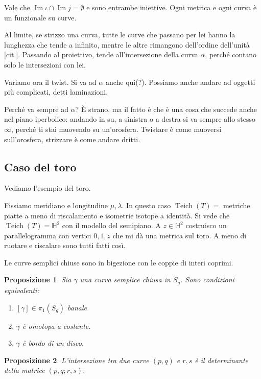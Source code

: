 \documentclass[a4paper]{article}
\newtheorem{proposition}{Proposizione}
\theoremstyle{definition}
\DeclareMathOperator{\Teich}{Teich}
\DeclareMathOperator{\im}{Im}
\begin{document}
    Vale che $\im \iota \cap \im j = \emptyset$ e sono entrambe iniettive. Ogni metrica e ogni curva è un funzionale su curve.

    Al limite, se strizzo una curva, tutte le curve che passano per lei hanno la lunghezza che tende a infinito, mentre le altre rimangono dell'ordine dell'unità [cit.].
    Passando al proiettivo, tende all'intersezione della curva $\alpha$, perché contano solo le intersezioni con lei.

    Variamo ora il twist. Si va ad $\alpha$ anche qui(?). Possiamo anche andare ad oggetti più complicati, detti laminazioni.

    Perché va sempre ad $\alpha$? È strano, ma il fatto è che è una cosa che succede anche nel piano iperbolico: andando in su, a sinistra o a destra si va sempre allo stesso $\infty$, perché ti stai muovendo su un'orosfera. Twistare è come muoversi sull'orosfera, strizzare è come andare dritti.

\subsection{Caso del toro}
    Vediamo l'esempio del toro.

    Fissiamo meridiano e longitudine $ \mu, \lambda$. In questo caso $\Teich(T) =$ metriche piatte a meno di riscalamento e isometrie isotope a identità. Si vede che $\Teich(T) = \mathbb H^2$ con il modello del semipiano. A $z \in \mathbb H^2$ costruisco un parallelogramma con vertici $0, 1, z$ che mi dà una metrica sul toro. A meno di ruotare e riscalare sono tutti fatti così.

    Le curve semplici chiuse sono in bigezione con le coppie di interi coprimi.

    \begin{proposition}
        Sia $\gamma$ una curva semplice chiusa in $S_g$. Sono condizioni equivalenti:
        \begin{enumerate}
            \item $[\gamma] \in \pi_1(S_g)$ banale
            \item $\gamma$ è omotopa a costante.
            \item $\gamma$ è bordo di un disco.
        \end{enumerate}
    \end{proposition}


    \begin{proposition}
        L'intersezione tra due curve $(p,q)$ e $r,s$ è il determinante della matrice $(p,q;r,s)$.
    \end{proposition}
\end{document}
